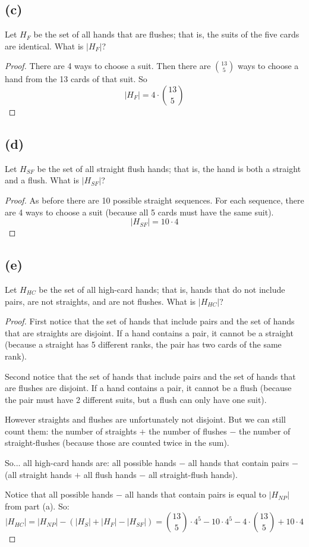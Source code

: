 \documentclass[14pt]{extarticle}
\begin{document}
\subsection{(c)}
Let $H_{F}$ be the set of all hands that are flushes; that is, the suits of the five cards are identical. What is $|H_{F}|$?
\begin{proof}
There are 4 ways to choose a suit. Then there are $\binom{13}{5}$ ways to choose a hand from the 13 cards of that suit. So
$$
|H_{F}| = 4 \cdot \binom{13}{5}
$$
\end{proof}
\subsection{(d)}
Let $H_{SF}$ be the set of all straight flush hands; that is, the hand is both a straight and a flush. What is $|H_{SF}|$?
\begin{proof}
As before there are 10 possible straight sequences. For each sequence, there are 4 ways to choose a suit (because all 5 cards must have the same suit).
$$
|H_{SF}| = 10 \cdot 4
$$
\end{proof}
\subsection{(e)}
Let $H_{HC}$ be the set of all high-card hands; that is, hands that do not include pairs, are not straights, and are not flushes. What is $|H_{HC}|$?
\begin{proof}
First notice that the set of hands that include pairs and the set of hands that are straights are disjoint. If a hand contains a pair, it cannot be a straight (because a straight has 5 different ranks, the pair has two cards of the same rank).

Second notice that the set of hands that include pairs and the set of hands that are flushes are disjoint. If a hand contains a pair, it cannot be a flush (because the pair must have 2 different suits, but a flush can only have one suit).

However straights and flushes are unfortunately not disjoint. But we can still count them: the number of straights $+$ the number of flushes $-$ the number of straight-flushes (because those are counted twice in the sum).

So... all high-card hands are: all possible hands $-$ all hands that contain pairs $-$ (all straight hands $+$ all flush hands $-$ all straight-flush hands).

Notice that all possible hands $-$ all hands that contain pairs is equal to $|H_{NP}|$ from part (a). So:
$$
|H_{HC}| = |H_{NP}| - (|H_{S}| + |H_{F}| - |H_{SF}|) = \binom{13}{5} \cdot 4^5 - 10 \cdot 4^5 - 4 \cdot \binom{13}{5} + 10 \cdot 4
$$
\end{proof}
\end{document}
